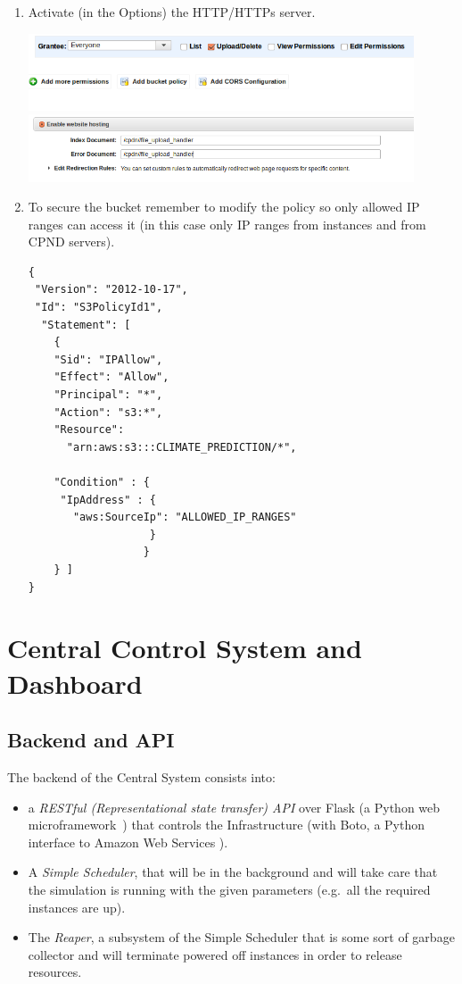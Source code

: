 \documentclass[journal abbreviation, manuscript]{copernicus}
\begin{document}
\begin{itemize}
\begin{enumerate}
\item Activate (in the Options) the HTTP/HTTPs server.
\begin{center}
  \includegraphics[width=4.5in]{images/screenshots/storage/storage03.png}\\
  \includegraphics[width=4.5in]{images/screenshots/storage/storage04.png}
\end{center}

\item To secure the bucket remember to modify the policy so only allowed IP ranges can access it (in this case only IP ranges from instances and from CPND servers).


\begin{verbatim}
{
 "Version": "2012-10-17",
 "Id": "S3PolicyId1",
  "Statement": [
    {
    "Sid": "IPAllow",
    "Effect": "Allow",
    "Principal": "*",
    "Action": "s3:*",
    "Resource":
      "arn:aws:s3:::CLIMATE_PREDICTION/*",

    "Condition" : {
     "IpAddress" : {
       "aws:SourceIp": "ALLOWED_IP_RANGES"
                   }
                  }
    } ]
}
\end{verbatim}
\end{enumerate}
\end{itemize}


\section{Central Control System and Dashboard}

\subsection{Backend and API}
The backend of the Central System consists into:
\begin{itemize}

\item a \textit{RESTful (Representational state transfer) API} over Flask (a Python web microframework~\citep{Flask:2013:Online}) that controls the Infrastructure (with Boto, a Python interface to Amazon Web Services \citep{Boto:2010:Online}).

\item A \textit{Simple Scheduler}, that will be in the background and will take care that the simulation is running with the given parameters (e.g.\ all the required instances are up).

\item The \textit{Reaper}, a subsystem of the Simple Scheduler that is some sort of garbage collector and will terminate powered off instances in order to release resources.
\end{itemize}
\end{document}
